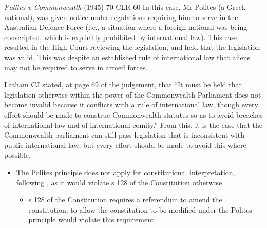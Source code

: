 \begin{casedetails}{\textit{Polites v Commonwealth} (1945) 70 CLR 60}
    \flushleft
    In this case, Mr Polites (a Greek national), was given notice under regulations requiring him to serve in the Australian Defence Force (i.e., a situation where a foreign national was being conscripted, which is explicitly prohibited by international law). This case resulted in the High Court reviewing the legislation, and held that the legislation was valid. This was despite an established rule of international law that aliens may not be required to serve in armed forces.

    \vspace{\baselineskip}

    Latham CJ stated, at page 69 of the judgement, that ``It must be held that legislation otherwise within the power of the Commonwealth Parliament does not become invalid because it conflicts with a rule of international law, though every effort should be made to construe Commonwealth statutes so as to avoid breaches of international law and of international comity.'' From this, it is the case that the Commonwealth parliament can still pass legislation that is inconsistent with public international law, but every effort should be made to avoid this where possible.
\end{casedetails}

\begin{itemize}
    \item The Polites principle does not apply for constitutional interpretation, following , as it would violate s 128 of the Constitution otherwise
    \begin{itemize}
        \item s 128 of the Constitution requires a referendum to amend the constitution; to allow the constitution to be modified under the Polites principle would violate this requirement
    \end{itemize}
\end{itemize}


